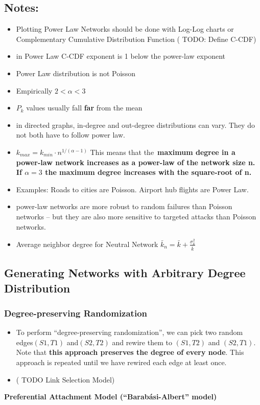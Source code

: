 \documentclass[crop=false]{standalone}
\begin{document}
\subsection{Notes: }
\begin{itemize}
    \item Plotting Power Law Networks should be done with Log-Log charts or Complementary Cumulative Distribution Function ( TODO: Define C-CDF)
    \item in Power Law C-CDF exponent is 1 below the power-law exponent
    \item Power Law distribution is not Poisson
    \item Empirically $2<\alpha<3$
    \item $P_k$ values usually fall \textbf{far} from the mean
    \item in directed graphs, in-degree and out-degree distributions can vary. They do not both have to follow power law.
    \item $k_{max} = k_{min} \cdot n^{1/(\alpha-1)}​$ This means that the \textbf{maximum degree in a power-law network increases as a power-law of the network size n. If $\alpha=3$ the maximum degree increases with the square-root of n.} 
    \item Examples: Roads to cities are Poisson. Airport hub flights are Power Law.
    \item power-law networks are more robust to random failures than Poisson networks – but they are also more sensitive to targeted attacks than Poisson networks. ​
    \item Average neighbor degree for Neutral Network $\bar{k}_{n} = \bar{k} + \frac{\sigma^2_k}{\bar{k}}​$

\end{itemize}

\subsection{Generating Networks with Arbitrary Degree Distribution}
\subsubsection{Degree-preserving Randomization}
\begin{itemize}
    \item To perform “degree-preserving randomization”, we can pick two random edges$(S1, T1)$ and$ (S2, T2)$ and rewire them to $(S1,T2)$ and $(S2, T1)$. Note that\textbf{ this approach preserves the degree of every node}. This approach is repeated until we have rewired each edge at least once.

    \item ( TODO Link Selection Model)
\end{itemize}
\textbf{Preferential Attachment Model (“Barabási-Albert” model)}
\end{document}
